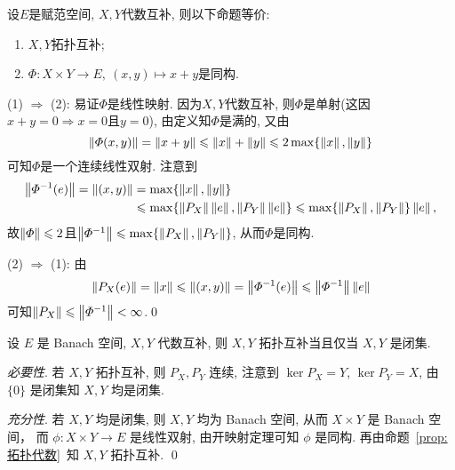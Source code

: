     \begin{Proposition}\label{prop:拓扑代数}
    设$ E $是赋范空间, $ X, Y $代数互补, 则以下命题等价:
    \begin{enumerate}[(1)]
    \item $ X, Y $拓扑互补;
    \item $ \varPhi : X\times Y\to E,\ (x,y)\mapsto x+y $是同构.
    \end{enumerate}
    \end{Proposition}
    \begin{Proof}
    (1) $ \Rightarrow $ (2): 易证$ \varPhi $是线性映射. 因为$ X, Y $代数互补, 则$ \varPhi $是单射(这因$ x+y=0\Longrightarrow x=0 $且$ y=0 $), 由定义知$ \varPhi $是满的, 又由
    \[
    \left\| \varPhi(x,y) \right\|=\left\| x+y \right\|\leqslant\left\| x \right\|+\left\| y \right\|\leqslant 2\max\{ \left\| x \right\|,\left\| y \right\| \}
    \]
    可知$ \varPhi $是一个连续线性双射. 注意到
    \[
    \begin{aligned}
    \left\| \varPhi^{-1}(e) \right\|=\left\| (x,y) \right\|&=\max\{ \left\| x \right\|,\left\| y \right\| \}\\
    &\leqslant\max\{ \left\| P_X \right\|\left\| e \right\|, \left\| P_Y \right\|\left\| e \right\| \}\leqslant\max\{ \left\| P_X \right\|,\left\| P_Y \right\| \}\left\| e \right\|,
    \end{aligned}
    \]
    故$ \left\| \varPhi \right\|\leqslant 2 $且$ \left\| \varPhi^{-1} \right\|\leqslant\max\{ \left\| P_X \right\|,\left\| P_Y \right\| \} $, 从而$ \varPhi $是同构.

    (2) $ \Rightarrow $ (1): 由
    \[
    \left\| P_X(e) \right\|=\left\| x \right\|\leqslant\left\| (x,y) \right\|=\left\| \varPhi^{-1}(e) \right\|\leqslant\left\| \varPhi^{-1} \right\|\left\| e \right\|
    \]
    可知$ \left\| P_X \right\|\leqslant\left\| \varPhi^{-1} \right\|<\infty $.\qed
    \end{Proof}
    \begin{Corollary}\label{cor:代数互补成为拓扑互补的条件}
        设 $ E $ 是 Banach 空间,  $ X, Y $ 代数互补, 则 $ X, Y $ 拓扑互补当且仅当 $ X, Y $ 是闭集.
    \end{Corollary}
    \begin{Proof}
        \textsl{必要性}. 若 $ X, Y $ 拓扑互补, 则 $ P_{X}, P_{Y} $ 连续, 注意到 $ \ker P_{X} = Y $,  $ \ker P_{Y}=X $, 由 $ \{0\} $ 是闭集知 $ X, Y $ 均是闭集.

        \textsl{充分性}.  若 $ X, Y $ 均是闭集, 则 $ X, Y $ 均为 Banach 空间, 从而 $ X\times Y $ 是 Banach 空间， 而 $ \phi : X\times Y\to E $ 是线性双射, 由开映射定理可知 $ \phi $ 是同构. 再由命题~\ref{prop:拓扑代数}~知 $ X, Y $ 拓扑互补. \qed
    \end{Proof}

